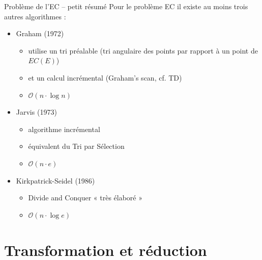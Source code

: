 \documentclass[aspectratio=1610,francais,envcountsect]{beamer}
\begin{document}
\begin{frame}{Problème de l'EC -- petit résumé}
  Pour le problème EC il existe au moins trois autres algorithmes :
  \begin{itemize}
  \item Graham (1972)
    \begin{itemize}
    \item utilise un tri préalable (tri angulaire des points par
      rapport à un point de $EC(E)$)
    \item et un calcul incrémental (Graham’s scan, cf. TD)
    \item $\mathcal{O}(n\cdot\log n)$
    \end{itemize}
  \item Jarvis (1973)
    \begin{itemize}
    \item algorithme incrémental
    \item équivalent du Tri par Sélection
    \item $\mathcal{O}(n\cdot e)$
    \end{itemize}
  \item Kirkpatrick-Seidel (1986)
    \begin{itemize}
    \item Divide and Conquer « très élaboré »
    \item $\mathcal{O}(n\cdot\log e)$
    \end{itemize}
  \end{itemize}
\end{frame}

\section{Transformation et réduction}
\end{document}
